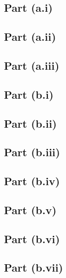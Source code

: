\subsection{Part (a.i)}\label{sec:q-1-a-i}
\subsection{Part (a.ii)}\label{sec:q-1-a-ii}
\subsection{Part (a.iii)}\label{sec:q-1-a-iii}
\subsection{Part (b.i)}\label{sec:q-1-b-i}
\subsection{Part (b.ii)}\label{sec:q-1-b-ii}
\subsection{Part (b.iii)}\label{sec:q-1-b-iii}
\subsection{Part (b.iv)}\label{sec:q-1-b-iv}
\subsection{Part (b.v)}\label{sec:q-1-b-v}
\subsection{Part (b.vi)}\label{sec:q-1-b-vi}
\subsection{Part (b.vii)}\label{sec:q-1-b-vii}
